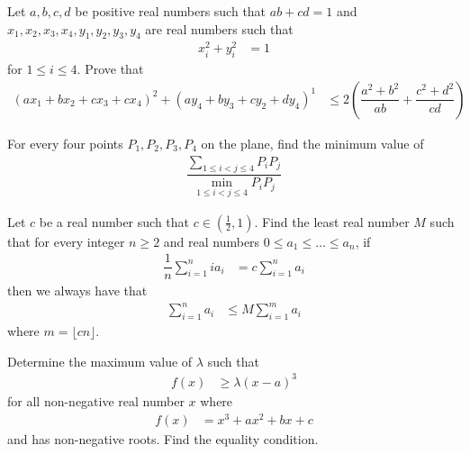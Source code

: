 \documentclass{subfile}
\begin{document}
		\begin{problem}[$2003$, problem $3$]
			Let $a,b,c,d$ be positive real numbers such that $ab+cd=1$ and $x_{1},x_{2},x_{3},x_{4},y_{1},y_{2},y_{3},y_{4}$ are real numbers such that
				\begin{align*}
					x_{i}^{2}+y_{i}^{2}
						& = 1
				\end{align*}
			for $1\leq i\leq 4$. Prove that
				\begin{align*}
					\left(ax_{1}+bx_{2}+cx_{3}+cx_{4}\right)^{2}+(ay_{4}+by_{3}+cy_{2}+dy_{4})^{1}
						& \leq 2\left(\dfrac{a^{2}+b^{2}}{ab}+\dfrac{c^{2}+d^{2}}{cd}\right)
				\end{align*}
		\end{problem}
	
		\begin{problem}[$2002$, problem $1$]
			For every four points $P_{1},P_{2},P_{3},P_{4}$ on the plane, find the minimum value of
				\begin{align*}
					\dfrac{\sum_{1\leq i<j\leq 4}P_{i}P_{j}}{\min\limits_{1\leq i<j\leq 4}P_{i}P_{j}}
				\end{align*}
		\end{problem}
	
		\begin{problem}[$2002$, problem $3$]
			Let $c$ be a real number such that $c\in\left(\frac{1}{2},1\right)$. Find the least real number $M$ such that for every integer $n\geq2$ and real numbers $0\leq a_{1}\leq \ldots\leq a_{n}$, if
				\begin{align*}
					\dfrac{1}{n}\sum_{i=1}^{n}ia_{i}
						& = c\sum_{i=1}^{n}a_{i}
				\end{align*}
			then we always have that
				\begin{align*}
					\sum_{i=1}^{n}a_{i}
						& \leq M\sum_{i=1}^{m}a_{i}
				\end{align*}
			where $m=\lfloor cn\rfloor$.
		\end{problem}
	
		\begin{problem}[$1999$, problem $5$]
			Determine the maximum value of $\lambda$ such that
				\begin{align*}
					f(x)
						& \geq \lambda(x-a)^{3}
				\end{align*}
			for all non-negative real number $x$ where
				\begin{align*}
					f(x)
						& = x^{3}+ax^{2}+bx+c
				\end{align*}
			and has non-negative roots. Find the equality condition.
		\end{problem}
	
\end{document}
